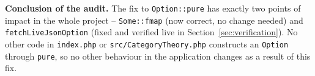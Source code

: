 \textbf{Conclusion of the audit.} The fix to \texttt{Option::pure} has exactly two points of impact in the whole project -- \texttt{Some::fmap} (now correct, no change needed) and \texttt{fetchLiveJsonOption} (fixed and verified live in Section~\ref{sec:verification}). No other code in \texttt{index.php} or \texttt{src/CategoryTheory.php} constructs an \texttt{Option} through \texttt{pure}, so no other behaviour in the application changes as a result of this fix.

